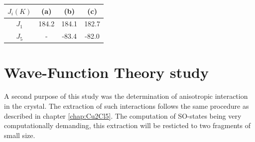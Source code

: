 \documentclass[10pt]{report}
\numberwithin{equation}{section}
\begin{document}
\begin{center}\label{ResultatsIntersite}
    \begin{tabular}{c c c c }
        \hline
        $J_i (K)$ & (a) & (b) & (c)  \\
        \hline
        $J_1$ & 184.2 & 184.1 & 182.7 \\
        $J_5$ & - & -83.4  & -82.0\\
        \hline
    \end{tabular}
\end{center}


\section{Wave-Function Theory study}

A second purpose of this study was the determination of anisotropic interaction in the crystal.
The extraction of such interactions follows the same procedure as described in chapter \autoref{chap:Cu2Cl5}.
The computation of SO-states being very computationally demanding, this extraction will be resticted to two fragments of small size.
\end{document}
